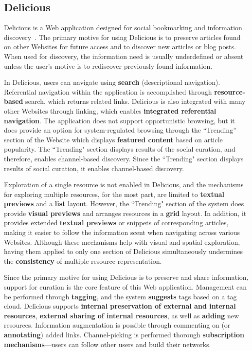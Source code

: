 \documentclass{sigchi}
\begin{document}
{\subsection{Delicious}
Delicious is a Web application designed for social bookmarking and information discovery~\cite{rader2008influences, tesconi2008semantify}. The primary motive for using Delicious is to preserve articles found on other Websites for future access and to discover new articles or blog posts. When used for discovery, the information need is usually underdefined or absent unless the user's motive is to rediscover previously found information.   

In Delicious, users can navigate using \textbf{search} (descriptional navigation). Referential navigation within the application is accomplished through \textbf{resource-based} search, which returns related links. Delicious is also integrated with many other Websites through linking, which enables \textbf{integrated referential navigation}. The application does not support opportunistic browsing, but it does provide an option for system-regulated browsing through the ``Trending'' section of the Website which displays \textbf{featured content} based on article popularity. The ``Trending" section displays results of the social curation, and therefore, enables channel-based discovery. Since the ``Trending" section displays results of social curation, it enables channel-based discovery.

Exploration of a single resource is not enabled in Delicious, and the mechanisms for exploring multiple resources, for the most part, are limited to \textbf{textual previews} and a \textbf{list} layout. However, the ``Trending" section of the system does provide \textbf{visual previews} and arranges resources in a \textbf{grid} layout. In addition, it provides extended \textbf{textual previews} or snippets of corresponding articles, making it easier to follow the information scent when navigating across various Websites. Although these mechanisms help with visual and spatial exploration, having them applied to only one section of Delicious simultaneously undermines the \textbf{consistency} of multiple resource representation. 

Since the primary motive for using Delicious is to preserve and share information, support for curation is the core feature of this Web application. Management can be performed through \textbf{tagging}, and the system \textbf{suggests} tags based on a tag cloud. Delicious supports \textbf{internal preservation of external and internal resources}, \textbf{external sharing of internal resources}, as well as \textbf{adding} new resources. Information augmentation is possible through commenting on (or \textbf{annotating}) added links. Channel-picking is performed thorough \textbf{subscription mechanisms}---users can follow other users and build their networks. 

}
\end{document}
